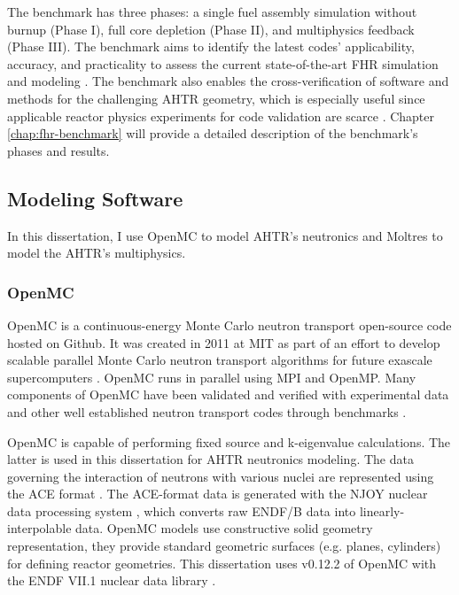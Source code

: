 The benchmark has three phases: a single fuel assembly simulation 
without burnup (Phase I), full core depletion (Phase II), and multiphysics 
feedback (Phase III). 
The benchmark aims to identify the latest codes' applicability, accuracy, 
and practicality to assess the current state-of-the-art FHR simulation 
and modeling \cite{petrovic_preliminary_2021}. 
The benchmark also enables the cross-verification of software and methods 
for the challenging \gls{AHTR} geometry, which is especially useful since 
applicable reactor physics experiments for code validation are scarce 
\cite{petrovic_fhrahtr_2019,petrovic_preliminary_2021}. 
Chapter \ref{chap:fhr-benchmark} will provide a detailed description of the 
benchmark's phases and results.

\subsection{Modeling Software}
\label{sec:lit-review-modeling-software}
In this dissertation, I use OpenMC \cite{romano_openmc:_2015} to model \gls{AHTR}'s 
neutronics and Moltres \cite{lindsay_introduction_2018} to model the \gls{AHTR}'s 
multiphysics. 

\subsubsection{OpenMC}
OpenMC \cite{romano_openmc:_2015} is a continuous-energy Monte Carlo neutron transport 
open-source code hosted on Github.
It was created in 2011 at \gls{MIT} as part of an effort to develop scalable parallel 
Monte Carlo neutron transport algorithms for future exascale supercomputers 
\cite{romano_openmc:_2015}.
OpenMC runs in parallel using \gls{MPI} and OpenMP. 
Many components of OpenMC have been validated and verified with experimental data 
and other well established neutron transport codes through benchmarks 
\cite{romano_openmc:_2015}. 

OpenMC is capable of performing fixed source and k-eigenvalue calculations. 
The latter is used in this dissertation for \gls{AHTR} neutronics modeling. 
The data governing the interaction of neutrons with various nuclei are represented using 
the ACE format \cite{x-5_monte_carlo_team_mcnp_2003}.
The ACE-format data is generated with the NJOY nuclear data processing system 
\cite{macfarlane_njoy_2017}, which converts raw ENDF/B data into linearly-interpolable 
data.
OpenMC models use constructive solid geometry representation, they provide standard 
geometric surfaces (e.g. planes, cylinders) for defining reactor geometries.  
This dissertation uses v0.12.2 of OpenMC with the ENDF VII.1 nuclear data library
\cite{chadwick_endf/b-vii.1_2011}. 

